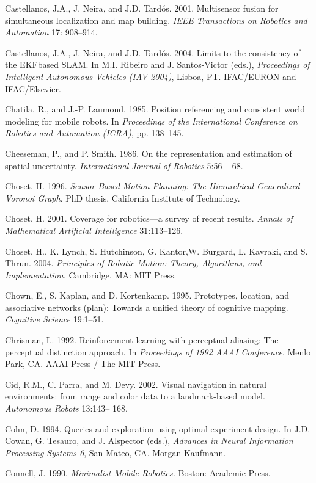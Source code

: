 \documentclass[10pt,a4paper]{article}
\begin{document}
Castellanos, J.A., J. Neira, and J.D. Tardós. 2001. Multisensor fusion for simultaneous
localization and map building. \textit{IEEE Transactions on Robotics and Automation} 17:
908–914.

Castellanos, J.A., J. Neira, and J.D. Tardós. 2004. Limits to the consistency of the EKFbased
SLAM. In M.I. Ribeiro and J. Santos-Victor (eds.), \textit{Proceedings of Intelligent
Autonomous Vehicles (IAV-2004)}, Lisboa, PT. IFAC/EURON and IFAC/Elsevier.

Chatila, R., and J.-P. Laumond. 1985. Position referencing and consistent world modeling
for mobile robots. In \textit{Proceedings of the International Conference on Robotics and
Automation (ICRA)}, pp. 138–145.

Cheeseman, P., and P. Smith. 1986. On the representation and estimation of spatial
uncertainty. \textit{International Journal of Robotics} 5:56 – 68.

Choset, H. 1996. \textit{Sensor Based Motion Planning: The Hierarchical Generalized Voronoi
Graph}. PhD thesis, California Institute of Technology.

Choset, H. 2001. Coverage for robotics—a survey of recent results. \textit{Annals of Mathematical
Artificial Intelligence} 31:113–126.

Choset, H., K. Lynch, S. Hutchinson, G. Kantor,W. Burgard, L. Kavraki, and S. Thrun.
2004. \textit{Principles of Robotic Motion: Theory, Algorithms, and Implementation.} Cambridge,
MA: MIT Press.

Chown, E., S. Kaplan, and D. Kortenkamp. 1995. Prototypes, location, and associative
networks (plan): Towards a unified theory of cognitive mapping. \textit{Cognitive Science}
19:1–51.

Chrisman, L. 1992. Reinforcement learning with perceptual aliasing: The perceptual
distinction approach. In \textit{Proceedings of 1992 AAAI Conference}, Menlo Park, CA.
AAAI Press / The MIT Press.

Cid, R.M., C. Parra, and M. Devy. 2002. Visual navigation in natural environments:
from range and color data to a landmark-based model.\textit{ Autonomous Robots} 13:143–
168.

Cohn, D. 1994. Queries and exploration using optimal experiment design. In J.D.
Cowan, G. Tesauro, and J. Alspector (eds.), \textit{Advances in Neural Information Processing
Systems 6}, San Mateo, CA. Morgan Kaufmann.

Connell, J. 1990. \textit{Minimalist Mobile Robotics.} Boston: Academic Press.
\end{document}

